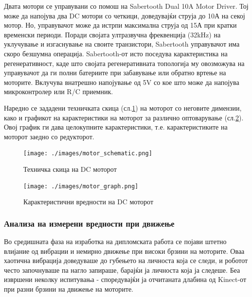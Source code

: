\documentclass[11pt]{article}
\begin{document}
		  Двата мотори се управувани со помош на Sabertooth Dual 10A Motor Driver. Тој може да напојува два DC мотори со четкици, доведувајќи струја до 10А на секој мотор. Но, управувачот може да истрпи максимална струја од 15А при кратки временски периоди. Поради својата ултразвучна фреквенција (32kHz) на уклучување и изгаснување на своите транзистори, Sabertooth управувачот има скоро безшумна операција. Sabertooth-от исто поседува карактеристика на регенеративност, каде што својата регенеративната топологија му овозможува на управувачот да ги полни батериите при забавување или обратно вртење на моторите. Вклучува внатрешно напојување од 5V со кое што може да напојува микроконтролер или R/C приемник.

		  Наредно се зададени техничката скица (сл.\ref{fig:motor_schematic}) на моторот со неговите димензии, како и графикот на карактеристики на моторот за различно оптоварување (сл.\ref{fig:motor_graph}). Овој график ги дава целокупните карактеристики, т.е. карактеристиките на моторот заедно со редукторот.

      \begin{figure}[H]
        \texttt{[image: ./images/motor\_schematic.png]}
		    \centering
        \caption{Техничка скица на DC моторот}
		    \label{fig:motor_schematic}
		    \end{figure}

	    \begin{figure}[H]
		    \texttt{[image: ./images/motor\_graph.png]}
		    \centering
		    \caption{Карактеристични вредности на DC моторот}
		    \label{fig:motor_graph}
	      \end{figure}

      \subsubsection{Анализа на измерени вредности при движење} \label{sec:composites}
      Во средишната фаза на изработка на дипломската работа се појави штетно влијание од вибрации и немирно движење при високи брзини на моторите. Оваа хаотична вибрација доведуваше до губењето на личноста која се следи, и роботот често започнуваше па нагло запираше, барајќи ја личноста која ја следеше. Беа извршени неколку испитувања - споредувајќи ја отчитаната длабина од Kinect-от при разни брзини на движење на моторите.
\end{document}
